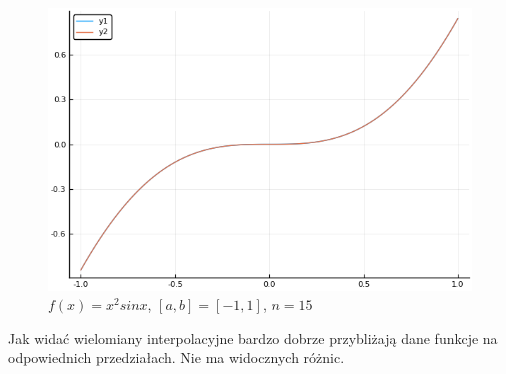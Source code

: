 \documentclass{article}
\begin{document}
\begin{figure}[H]
	\includegraphics[width=\linewidth]{zad5b_15.png}
	\caption{$f(x) = x^2 sin x$, $[a,b]=[-1,1]$, $n=15$}
	\label{fig:5a5}
\end{figure}
Jak widać wielomiany interpolacyjne bardzo dobrze przybliżają dane funkcje na odpowiednich przedziałach. Nie ma widocznych różnic.
\end{document}
